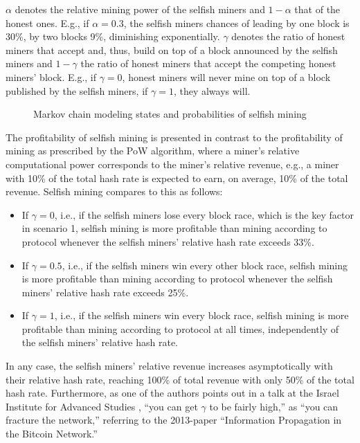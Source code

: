 $\alpha$ denotes the relative mining power of the selfish miners and $1 - \alpha$ that of the honest ones.
E.g., if $\alpha = 0.3$, the selfish miners chances of  leading by one block is 30\%, by two blocks 9\%, diminishing exponentially.
$\gamma$ denotes the ratio of honest miners that accept and, thus, build on top of a block announced by the selfish miners and $1 - \gamma$ the ratio of honest miners that accept the competing honest miners' block.
E.g., if $\gamma = 0$, honest miners will never mine on top of a block published by the selfish miners, if $\gamma = 1$, they always will.
\\
\begin{figure}[H]
	\centering
	
	\caption*{Markov chain modeling states and probabilities of selfish mining \autocite[8]{eyal2014}}
\end{figure}

The profitability of selfish mining is presented in contrast to the profitability of mining as prescribed by the PoW algorithm, where a miner's relative computational power corresponds to the miner's relative revenue, e.g., a miner with 10\% of the total hash rate is expected to earn, on average, 10\% of the total revenue.
Selfish mining compares to this as follows:

\begin{itemize}
	\item
		If $\gamma = 0$, i.e., if the selfish miners lose every block race, which is the key factor in scenario 1, selfish mining is more profitable than mining according to protocol whenever the selfish miners' relative hash rate exceeds 33\%.
	\item
		If $\gamma = 0.5$, i.e., if the selfish miners win every other block race, selfish mining is more profitable than mining according to protocol whenever the selfish miners' relative hash rate exceeds 25\%.
	\item
		If $\gamma = 1$, i.e., if the selfish miners win every block race, selfish mining is more profitable than mining according to protocol at all times, independently of the selfish miners' relative hash rate.
\end{itemize}

In any case, the selfish miners' relative revenue increases asymptotically with their relative hash rate, reaching 100\% of total revenue with only 50\% of the total hash rate.
Furthermore, as one of the authors points out in a talk at the Israel Institute for Advanced Studies \autocite{youtube2018alternativestotonakamotoconsensus}, ``you can get $\gamma$ to be fairly high,'' as ``you can fracture the network,'' referring to the 2013-paper ``Information Propagation in the Bitcoin Network.'' \autocite{decker2013}


